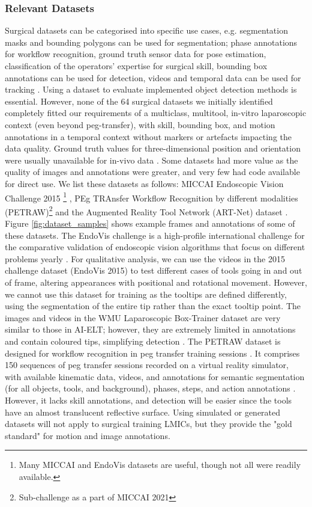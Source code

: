 \subsubsection{Relevant Datasets}

Surgical datasets can be categorised into specific use cases, e.g. segmentation masks and bounding polygons can be used for segmentation; phase annotations for workflow recognition, ground truth sensor data for pose estimation, classification of the operators' expertise for surgical skill, bounding box annotations can be used for detection, videos and temporal data can be used for tracking  \cite{rodrigues_surgical_2022}. Using a dataset to evaluate implemented object detection methods is essential. However, none of the 64 surgical datasets we initially identified completely fitted our requirements of a multiclass, multitool, in-vitro laparoscopic context (even beyond peg-transfer), with skill, bounding box, and motion annotations in a temporal context without markers or artefacts impacting the data quality. Ground truth values for three-dimensional position and orientation were usually unavailable for in-vivo data \cite{allan_toward_2013}. Some datasets had more value as the quality of images and annotations were greater, and very few had code available for direct use. We list these datasets as follows: MICCAI  Endoscopic Vision Challenge 2015 \footnote{Many MICCAI and EndoVis datasets are useful, though not all were readily available.} \cite{bernal_comparative_2017}, PEg TRAnsfer Workflow Recognition by different modalities (PETRAW)\footnote{Sub-challenge as a part of MICCAI 2021} \cite{huaulme_peg_2022} and the Augmented Reality Tool Network (ART-Net) dataset \cite{hasan_detection_2021}. Figure \ref{fig:dataset_samples} shows example frames and annotations of some of these datasets. The EndoVis challenge is a high-profile international challenge for the comparative validation of endoscopic vision algorithms that focus on different problems yearly \cite{fernandes_future_2023}. For qualitative analysis, we can use the videos in the 2015 challenge dataset (EndoVis 2015) to test different cases of tools going in and out of frame, altering appearances with positional and rotational movement. However, we cannot use this dataset for training as the tooltips are defined differently, using the segmentation of the entire tip rather than the exact tooltip point. The images and videos in the WMU Laparoscopic Box-Trainer dataset are very similar to those in AI-ELT; however, they are extremely limited in annotations and contain coloured tips, simplifying detection \cite{fathabadi_box-trainer_2022}. The PETRAW dataset is designed for workflow recognition in peg transfer training sessions \cite{huaulme_peg_2022}. It comprises 150 sequences of peg transfer sessions recorded on a virtual reality simulator, with available kinematic data, videos, and annotations for semantic segmentation (for all objects, tools, and background), phases, steps, and action annotations \cite{alabi_multitask_2024, huaulme_peg_2022}. However, it lacks skill annotations, and detection will be easier since the tools have an almost translucent reflective surface. Using simulated or generated datasets \cite{cartucho_visionblender_2021} will not apply to surgical training LMICs, but they provide the "gold standard" for motion and image annotations.
